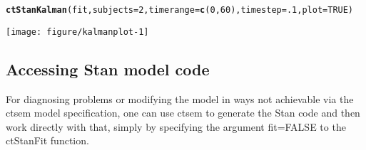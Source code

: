 \documentclass[nojss]{jss}\usepackage[]{graphicx}\usepackage[]{color}
\makeatletter
\def\maxwidth{ %
  \ifdim\Gin@nat@width>\linewidth
    \linewidth
  \else
    \Gin@nat@width
  \fi
}
\newcommand{\hlnum}[1]{\textcolor[rgb]{0.686,0.059,0.569}{#1}}%
\newcommand{\hlstd}[1]{\textcolor[rgb]{0.345,0.345,0.345}{#1}}%
\newcommand{\hlkwc}[1]{\textcolor[rgb]{0.333,0.667,0.333}{#1}}%
\newcommand{\hlkwd}[1]{\textcolor[rgb]{0.737,0.353,0.396}{\textbf{#1}}}%
\newenvironment{kframe}{%
 \def\at@end@of@kframe{}%
 \ifinner\ifhmode%
  \def\at@end@of@kframe{\end{minipage}}%
  \begin{minipage}{\columnwidth}%
 \fi\fi%
 \def\FrameCommand##1{\hskip\@totalleftmargin \hskip-\fboxsep
 \colorbox{shadecolor}{##1}\hskip-\fboxsep
     \hskip-\linewidth \hskip-\@totalleftmargin \hskip\columnwidth}%
 \MakeFramed {\advance\hsize-\width
   \@totalleftmargin\z@ \linewidth\hsize
   \@setminipage}}%
 {\par\unskip\endMakeFramed%
 \at@end@of@kframe}
\newenvironment{knitrout}{}{} %
\makeatother
\begin{document}
\begin{knitrout}\small
{}\color{fgcolor}\begin{kframe}
\begin{alltt}
\hlkwd{ctStanKalman}\hlstd{(fit,} \hlkwc{subjects}\hlstd{=}\hlnum{2}\hlstd{,} \hlkwc{timerange}\hlstd{=}\hlkwd{c}\hlstd{(}\hlnum{0}\hlstd{,}\hlnum{60}\hlstd{),} \hlkwc{timestep}\hlstd{=}\hlnum{.1}\hlstd{,} \hlkwc{plot}\hlstd{=}\hlnum{TRUE}\hlstd{)}
\end{alltt}
\end{kframe}

{\centering \texttt{[image: figure/kalmanplot-1]} 

}



\end{knitrout}


\subsection{Accessing Stan model code}
For diagnosing problems or modifying the model in ways not achievable via the ctsem model specification, one can use ctsem to generate the Stan code and then work directly with that, simply by specifying the argument fit=FALSE to the ctStanFit function. 
\end{document}
